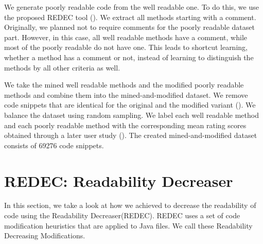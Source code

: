 \documentclass[%
class=scrreprt,
chapterprefix=false,%
open=right,%
twoside=true,%
paper=a4,%
logofile={Logo\_zentral\_farbig\_EN.png},%
thesistype=master,%
UKenglish,%
]{se2thesis}
\theoremstyle{definition}
\newcommand{\numSamplesAccurate}{69276\xspace}
\newcommand{\RDH}{Readability Decreaser\xspace}
\newcommand{\rdh}{REDEC\xspace}
\newcommand{\RDHa}{\RDH (\rdh)\xspace} %
\newcommand{\RDMs}{Readability Decreasing Modifications\xspace}
\begin{document}
	We generate poorly readable code from the well readable one. To do this, we use the proposed \rdh tool (). We extract all methods starting with a comment.
	Originally, we planned not to require comments for the poorly readable dataset part. However, in this case, all well readable methods have a comment, while most of the poorly readable do not have one. This leads to shortcut learning, whether a method has a comment or not, instead of learning to distinguish the methods by all other criteria as well.
	
	We take the mined well readable methods and the modified poorly readable methods and combine them into the mined-and-modified dataset. We remove code snippets that are identical for the original and the modified variant (). We balance the dataset using random sampling.
	We label each well readable method and each poorly readable method with the corresponding mean rating scores obtained through a later user study ().
	The created mined-and-modified dataset consists of \numSamplesAccurate code snippets.
	
\section{REDEC: Readability Decreaser} \label{REDEC}
	In this section, we take a look at how we achieved to decrease the readability of code using the \RDHa.
	\rdh uses a set of code modification heuristics that are applied to Java files. We call these \RDMs.
	
\end{document}
